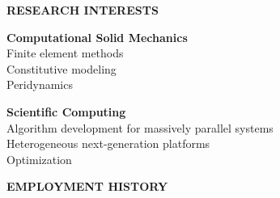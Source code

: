 \documentclass[11pt]{article}
\newlength{\sectionskip} \setlength{\sectionskip}{0.2in}
\newlength{\minipagewidth} \setlength{\minipagewidth}{6.25in} %
\newlength{\myparindent} \setlength{\myparindent}{0.25in}
\begin{document}
\vspace{\sectionskip}
\noindent
{\large \textbf{RESEARCH INTERESTS}}
\vspace{\sectionskip}

\begin{minipage}{\minipagewidth}
\setlength{\parindent}{\myparindent}
\noindent \textbf{Computational Solid Mechanics} \\
\indent Finite element methods \\
\indent Constitutive modeling \\
\indent Peridynamics
\end{minipage}\vspace{\parskip}

\begin{minipage}{\minipagewidth}
\setlength{\parindent}{\myparindent}
\noindent \textbf{Scientific Computing} \\
\indent Algorithm development for massively parallel systems \\
\indent Heterogeneous next-generation platforms \\
\indent Optimization
\end{minipage}


\vspace{\sectionskip}
\noindent
{\large \textbf{EMPLOYMENT HISTORY}}
\vspace{\sectionskip}
\end{document}

